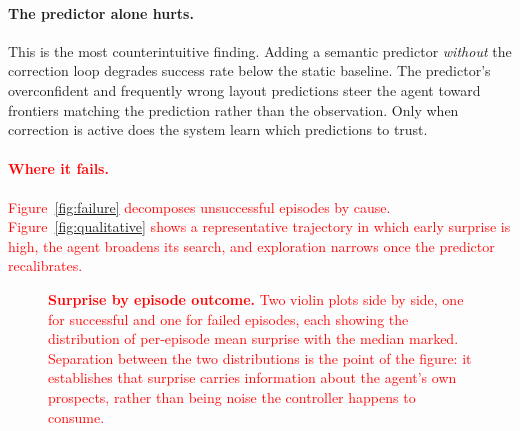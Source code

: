 \paragraph{The predictor alone hurts.} This is the most counterintuitive finding. Adding a semantic predictor \emph{without} the correction loop degrades success rate below the static baseline. The predictor's overconfident and frequently wrong layout predictions steer the agent toward frontiers matching the prediction rather than the observation. Only when correction is active does the system learn which predictions to trust.

\textcolor{red}{\paragraph{Where it fails.} Figure~\ref{fig:failure} decomposes unsuccessful episodes by cause. Figure~\ref{fig:qualitative} shows a representative trajectory in which early surprise is high, the agent broadens its search, and exploration narrows once the predictor recalibrates.}

\textcolor{red}{
\begin{table}[H]
\centering
\caption{\textcolor{red}{\textbf{Cost of the correction loop.} Per-episode averages for the static baseline and the full loop under identical conditions. The comparison is intended to show that the loop adds a modest number of VLM calls while \emph{reducing} navigation steps, so that the net cost of adaptation is small or negative.}}
\label{tab:compute}
\vspace{1mm}
\end{table}
}

\textcolor{red}{
\begin{figure}[H]
\centering
\plotbox{4.2cm}
\caption{\textcolor{red}{\textbf{Surprise by episode outcome.} Two violin plots side by side, one for successful and one for failed episodes, each showing the distribution of per-episode mean surprise with the median marked. Separation between the two distributions is the point of the figure: it establishes that surprise carries information about the agent's own prospects, rather than being noise the controller happens to consume.}}
\label{fig:surprise}
\end{figure}
}

